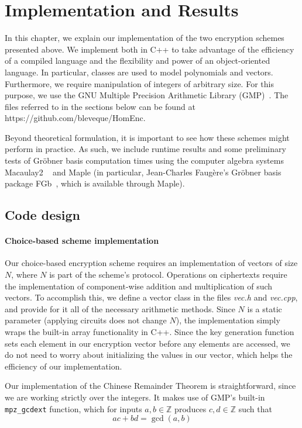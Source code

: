 \documentclass[11pt]{report}
\newcommand{\Z}{\mathbb{Z}}
\begin{document}
\chapter{Implementation and Results}
\label{chap:implementation}
In this chapter, we explain our implementation of the two encryption schemes presented above. We implement both in C++ to take advantage of the efficiency of a compiled language and the flexibility and power of an object-oriented language. In particular, classes are used to model polynomials and vectors. Furthermore, we require manipulation of integers of arbitrary size. For this purpose, we use the GNU Multiple Precision Arithmetic Library (GMP)~\cite{gmp-manual}. The files referred to in the sections below can be found at https://github.com/bleveque/HomEnc.

Beyond theoretical formulation, it is important to see how these schemes might perform in practice. As such, we include runtime results and some preliminary tests of Gr\"obner basis computation times using the computer algebra systems Macaulay2 ~\cite{M2} and Maple (in particular, Jean-Charles Faug\`ere's Gr\"obner basis package FGb~\cite{faugere-fgb}, which is available through Maple).

\section{Code design}
\subsubsection{Choice-based scheme implementation}
Our choice-based encryption scheme requires an implementation of vectors of size $N$, where $N$ is part of the scheme's protocol. Operations on ciphertexts require the implementation of component-wise addition and multiplication of such vectors. To accomplish this, we define a vector class in the files \emph{vec.h} and \emph{vec.cpp}, and provide for it all of the necessary arithmetic methods. Since $N$ is a static parameter (applying circuits does not change $N$), the implementation simply wraps the built-in array functionality in C++. Since the key generation function sets each element in our encryption vector before any elements are accessed, we do not need to worry about initializing the values in our vector, which helps the efficiency of our implementation.

Our implementation of the Chinese Remainder Theorem is straightforward, since we are working strictly over the integers. It makes use of GMP's built-in \verb|mpz_gcdext| function, which for inputs $a,b\in\Z$ produces $c,d\in\Z$ such that
\[ac+bd=\gcd(a,b)\]
\end{document}
